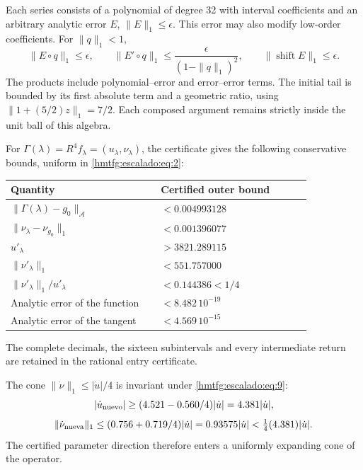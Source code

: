 Each series consists of a polynomial of degree 32 with interval coefficients and an arbitrary analytic error \(E\), \(\|E\|_1\le\epsilon\). This error may also modify low-order coefficients. For \(\|q\|_1<1\),
\begin{equation}
\|E\circ q\|_1\le\epsilon,\qquad
\|E'\circ q\|_1\le\frac{\epsilon}{(1-\|q\|_1)^2},\qquad
\|\operatorname{shift}E\|_1\le\epsilon.
\label{hmtfg:escalado:eq:10}
\end{equation}
The products include polynomial–error and error–error terms. The initial tail is bounded by its first absolute term and a geometric ratio, using \(\|1+(5/2)z\|_1=7/2\). Each composed argument remains strictly inside the unit ball of this algebra.

For \(\Gamma(\lambda)=R^4f_\lambda=(u_\lambda,\nu_\lambda)\), the certificate gives the following conservative bounds, uniform in \eqref{hmtfg:escalado:eq:2}:

\begingroup\small
\begin{longtable}{p{0.465\linewidth}p{0.465\linewidth}}
\hline
Quantity & Certified outer bound \\
\hline
\(\|\Gamma(\lambda)-g_0\|_{\mathcal A}\) & \(<0.004993128\) \\
\(\|\nu_\lambda-\nu_{g_0}\|_1\) & \(<0.001396077\) \\
\(u'_\lambda\) & \(>3821.289115\) \\
\(\|\nu'_\lambda\|_1\) & \(<551.757000\) \\
\(\|\nu'_\lambda\|_1/u'_\lambda\) & \(<0.144386<1/4\) \\
Analytic error of the function & \(<8.482\,10^{-19}\) \\
Analytic error of the tangent & \(<4.569\,10^{-15}\) \\
\hline\end{longtable}
\endgroup

The complete decimals, the sixteen subintervals and every intermediate return are retained in the rational entry certificate.

The cone \(\|\dot\nu\|_1\le|\dot u|/4\) is invariant under \eqref{hmtfg:escalado:eq:9}:
\[
|\dot u_{\rm nuevo}|\ge(4.521-0.560/4)|\dot u|
=4.381|\dot u|,
\]
\begin{equation}
\|\dot\nu_{\rm nueva}\|_1\le(0.756+0.719/4)|\dot u|
=0.93575|\dot u|<\tfrac14(4.381)|\dot u|.
\label{hmtfg:escalado:eq:11}
\end{equation}
The certified parameter direction therefore enters a uniformly expanding cone of the operator.


